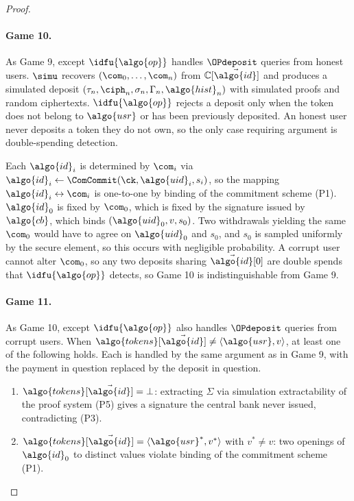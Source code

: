 \begin{proof}
\paragraph{Game 10.} As Game 9, except $\idfu{\algo{op}}$ handles $\OPdeposit$
queries from honest users. $\simu$ recovers $(\com_0,\allowbreak \ldots,\allowbreak \com_n)$ from
$\mathbb{C}[\vec{\algo{id}}]$ and produces a simulated deposit $(\tau_n,\allowbreak \ciph_n,
\sigma_n,\allowbreak \Gamma_n,\allowbreak \algo{hist}_n)$ with simulated proofs and random
ciphertexts. $\idfu{\algo{op}}$ rejects a deposit only when the token does not
belong to $\algo{usr}$ or has been previously deposited. An honest user never
deposits a token they do not own, so the only case requiring argument is double-spending
detection.

Each $\algo{id}_i$ is determined by $\com_i$ via $\algo{id}_i \leftarrow \ComCommit(\ck,
\algo{uid}_i, s_i)$, so the mapping $\algo{id}_i \leftrightarrow \com_i$ is
one-to-one by binding of the commitment scheme (P1). $\algo{id}_0$ is fixed by
$\com_0$, which is fixed by the signature issued by $\algo{cb}$, which
binds $(\algo{uid}_0, v, s_0)$. Two withdrawals yielding the same $\com_0$ would
have to agree on $\algo{uid}_0$ and $s_0$, and $s_0$ is sampled uniformly by the
secure element, so this occurs with negligible probability. A corrupt user
cannot alter $\com_0$, so any two deposits sharing $\vec{\algo{id}}[0]$ are double
spends that $\idfu{\algo{op}}$ detects, so Game 10 is
indistinguishable from Game 9.

\paragraph{Game 11.} As Game 10, except $\idfu{\algo{op}}$ also handles
$\OPdeposit$ queries from corrupt users. When $\algo{tokens}[\vec{\algo{id}}] \neq
\langle \algo{usr}, v \rangle$, at least one of the following holds. Each is
handled by the same argument as in Game 9, with the payment in question replaced
by the deposit in question.

\begin{enumerate}[label=\alph*)]

  \item $\algo{tokens}[\vec{\algo{id}}] = \bot$: extracting $\Sigma$ via simulation
extractability of the proof system (P5) gives a signature the central bank never
issued, contradicting (P3).

  \item $\algo{tokens}[\vec{\algo{id}}] = \langle \algo{usr}^*, v^* \rangle$ with
$v^* \neq v$: two openings of $\algo{id}_0$ to distinct
values violate binding of the commitment scheme (P1).


\end{enumerate}
\end{proof}

